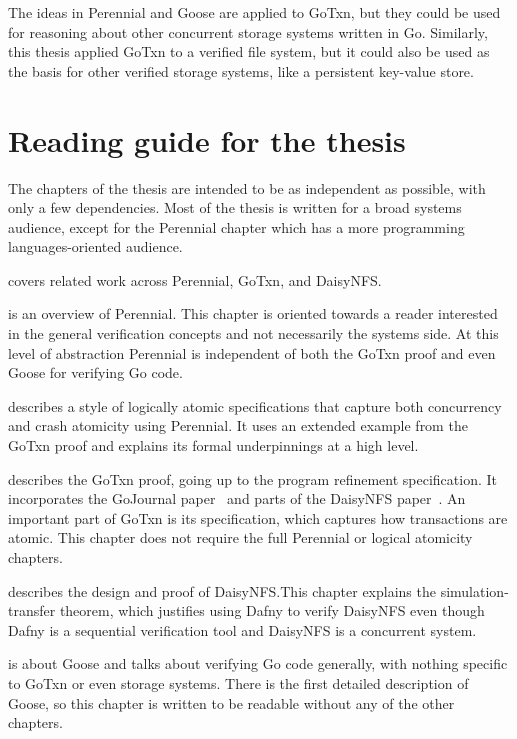 The ideas in Perennial and Goose are applied to GoTxn, but they could be used
for reasoning about other concurrent storage systems written in Go. Similarly,
this thesis applied GoTxn to a verified file system, but it could also be used
as the basis for other verified storage systems, like a persistent key-value
store.

\section{Reading guide for the thesis}
\label{sec:intro:reading-guide}

The chapters of the thesis are intended to be as independent as possible, with
only a few dependencies. Most of the thesis is written for a broad systems
audience, except for the Perennial chapter which has a more programming
languages-oriented audience.

 covers related work across Perennial, GoTxn, and DaisyNFS.

 is an overview of Perennial. This chapter is oriented
towards a reader interested in the general verification concepts and not
necessarily the systems side. At this level of abstraction Perennial is
independent of both the GoTxn proof and even Goose for verifying Go code.

 describes a style of logically atomic specifications
that capture both concurrency and crash atomicity using Perennial. It uses an
extended example from the GoTxn proof and explains its formal underpinnings at a
high level.

 describes the GoTxn proof, going up to the program refinement
specification. It incorporates the GoJournal paper~\cite{chajed:gojournal} and
parts of the DaisyNFS paper~\cite{chajed:daisy-nfs}. An important part of GoTxn
is its specification, which captures how transactions are atomic. This chapter
does not require the full Perennial or logical atomicity chapters.

 describes the design and proof of DaisyNFS.\@ This chapter
explains the simulation-transfer theorem, which justifies using Dafny to verify
DaisyNFS even though Dafny is a sequential verification tool and DaisyNFS is a
concurrent system.

 is about Goose and talks about verifying Go code generally, with
nothing specific to GoTxn or even storage systems. There is the first detailed
description of Goose, so this chapter is written to be readable without any of
the other chapters.
